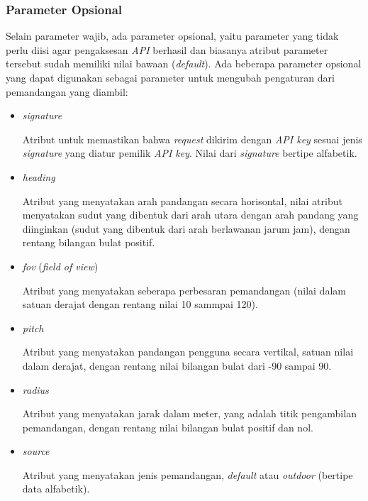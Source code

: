 \subsubsection{Parameter Opsional}
Selain parameter wajib, ada parameter opsional, yaitu parameter yang tidak perlu diisi agar pengaksesan {\it API} berhasil dan biasanya atribut parameter tersebut sudah memiliki nilai bawaan ({\it default}). Ada beberapa parameter opsional yang dapat digunakan sebagai parameter untuk mengubah pengaturan dari pemandangan yang diambil:
\begin{itemize}
	\item {\it signature}
	
	Atribut untuk memastikan bahwa \textit{request} dikirim dengan {\it API key} sesuai jenis \textit{signature} yang diatur pemilik {\it API key}. Nilai dari \textit{signature} bertipe alfabetik.
	\item {\it heading}
	
	Atribut yang menyatakan arah pandangan secara horisontal, nilai atribut menyatakan sudut yang dibentuk dari arah utara dengan arah pandang yang diinginkan (sudut yang dibentuk dari arah berlawanan jarum jam), dengan rentang bilangan bulat positif.
	\item {\it fov} ({\it field of view})
	
	Atribut yang menyatakan seberapa perbesaran pemandangan (nilai dalam satuan derajat dengan rentang nilai 10 sammpai 120).
	\item {\it pitch}
	
	Atribut yang menyatakan pandangan pengguna secara vertikal, satuan nilai dalam derajat, dengan rentang nilai bilangan bulat dari -90 sampai 90.
	\item {\it radius} 
	
	Atribut yang menyatakan jarak dalam meter, yang adalah titik pengambilan pemandangan, dengan rentang nilai bilangan bulat positif dan nol. 
	\item {\it source}
	
	Atribut yang menyatakan jenis pemandangan, \textit{default} atau \textit{outdoor} (bertipe data alfabetik).
\end{itemize}
    

